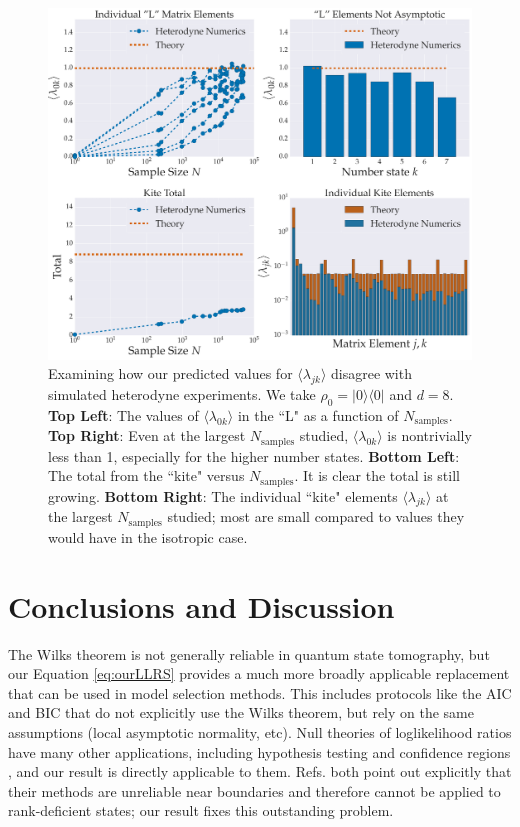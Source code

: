 \documentclass[aps,pra, twocolumn]{revtex4-1}
\begin{document}
\begin{figure}[h]
  \includegraphics[width=\columnwidth]{Images/Figure_11.pdf}
 \caption{Examining how our predicted values for $\langle \lambda_{jk} \rangle$ disagree with simulated heterodyne experiments. We take $\rho_{0} = |0\rangle\langle 0|$ and $d=8$. \textbf{Top Left}: The values of  $\langle \lambda_{0k}\rangle$ in the ``L" as a function of $N_{\mathrm{samples}}$.  \textbf{Top Right}:  Even at the largest $N_{\mathrm{samples}}$ studied, $\langle \lambda_{0k}\rangle$ is nontrivially less than 1, especially for the higher number states. \textbf{Bottom Left}: The total from the ``kite" versus $N_{\mathrm{samples}}$. It is clear the total is still growing. \textbf{Bottom Right}: The individual ``kite" elements $\langle \lambda_{jk}\rangle$ at the largest $N_{\mathrm{samples}}$ studied;  most are small compared to values they would have in the isotropic case.}
\label{fig:individcontrib}
\end{figure}



\section{Conclusions and Discussion}
The Wilks theorem is not generally reliable in quantum state tomography, but our Equation \eqref{eq:ourLLRS} provides a much more broadly applicable replacement that can be used in model selection methods.  This includes protocols like the AIC and BIC \cite{Akaike1974, Schwarz1978, Kass1995, Burnham2004} that do not explicitly use the Wilks theorem, but rely on the same assumptions (local asymptotic normality, etc).  Null theories of loglikelihood ratios have many other applications, including hypothesis testing \cite{Blume-Kohout2010,Moroder2013} and confidence regions \cite{Glancy2012a}, and our result is directly applicable to them.  Refs. \cite{Moroder2013,Glancy2012a} both point out explicitly that their methods are unreliable near boundaries and therefore cannot be applied to rank-deficient states; our result fixes this outstanding problem.
\end{document}
